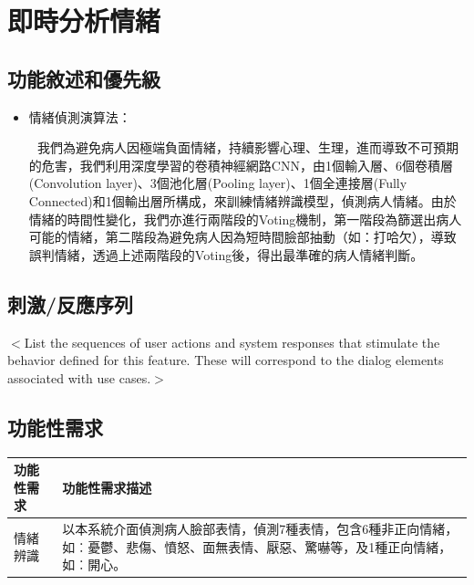 \documentclass[12pt]{scrreprt}
\begin{document}
\section{即時分析情緒}

\subsection{功能敘述和優先級}

\begin{itemize}
\item{\begin{bfseries}{情緒偵測演算法：}\end{bfseries}}

$~~~$我們為避免病人因極端負面情緒，持續影響心理、生理，進而導致不可預期的危害，我們利用深度學習的卷積神經網路CNN，由1個輸入層、6個卷積層(Convolution layer)、3個池化層(Pooling layer)、1個全連接層(Fully Connected)和1個輸出層所構成，來訓練情緒辨識模型，偵測病人情緒。由於情緒的時間性變化，我們亦進行兩階段的Voting機制，第一階段為篩選出病人可能的情緒，第二階段為避免病人因為短時間臉部抽動（如：打哈欠），導致誤判情緒，透過上述兩階段的Voting後，得出最準確的病人情緒判斷。\\

\end{itemize}

\subsection{刺激/反應序列}
$<$List the sequences of user actions and system responses that stimulate the 
behavior defined for this feature. These will correspond to the dialog elements 
associated with use cases.$>$

\subsection{功能性需求}

\begin{center}  
\begin{tabular}{|l| p{10cm}|}  
\hline  
功能性需求 & 功能性需求描述   \\ \hline  
情緒辨識 &以本系統介面偵測病人臉部表情，偵測7種表情，包含6種非正向情緒，如︰憂鬱、悲傷、憤怒、面無表情、厭惡、驚嚇等，及1種正向情緒，如︰開心。    \\ \hline  

\end{tabular}  
\end{center}  
\end{document}
